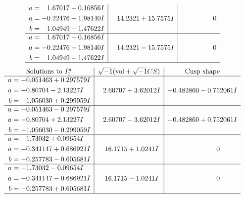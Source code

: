 \documentclass[1p]{elsarticle_modified}
\theoremstyle{definition}
\newcommand{\I}{\sqrt{-1}}
\begin{document}
$$\begin{array}{c|c|c}
\begin{aligned}
u &= \phantom{-}1.67017 + 0.16856 I \\
a &= -0.22476 + 1.98140 I \\
b &= \phantom{-}1.04949 - 1.47622 I\end{aligned}
 & \phantom{-}14.2321 + 15.7575 I & \phantom{-0.000000 } 0 \\ \hline\begin{aligned}
u &= \phantom{-}1.67017 - 0.16856 I \\
a &= -0.22476 - 1.98140 I \\
b &= \phantom{-}1.04949 + 1.47622 I\end{aligned}
 & \phantom{-}14.2321 - 15.7575 I & \phantom{-0.000000 } 0\\
 \hline 
 \end{array}$$\newpage$$\begin{array}{c|c|c}  
\text{Solutions to }I^u_{1}& \I (\text{vol} + \sqrt{-1}CS) & \text{Cusp shape}\\
 \hline 
\begin{aligned}
u &= -0.051463 + 0.297579 I \\
a &= -0.80704 - 2.13227 I \\
b &= -1.056030 + 0.299059 I\end{aligned}
 & \phantom{-}2.60707 + 3.62012 I & -0.482860 - 0.752061 I \\ \hline\begin{aligned}
u &= -0.051463 - 0.297579 I \\
a &= -0.80704 + 2.13227 I \\
b &= -1.056030 - 0.299059 I\end{aligned}
 & \phantom{-}2.60707 - 3.62012 I & -0.482860 + 0.752061 I \\ \hline\begin{aligned}
u &= -1.73032 + 0.09654 I \\
a &= -0.341147 + 0.686921 I \\
b &= -0.257783 - 0.605681 I\end{aligned}
 & \phantom{-}16.1715 + 1.0241 I & \phantom{-0.000000 } 0 \\ \hline\begin{aligned}
u &= -1.73032 - 0.09654 I \\
a &= -0.341147 - 0.686921 I \\
b &= -0.257783 + 0.605681 I\end{aligned}
 & \phantom{-}16.1715 - 1.0241 I & \phantom{-0.000000 } 0\\
 \hline 
 \end{array}$$\newpage\newpage\renewcommand{\arraystretch}{1}
\end{document}
